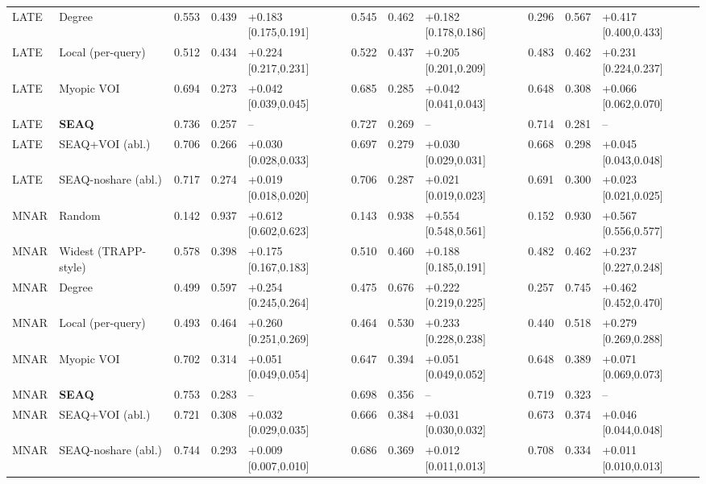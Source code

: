 \begin{table}[t]
\begin{tabular}{llccl|ccl|ccl}
LATE & Degree & 0.553 & 0.439 & +0.183 [0.175,0.191] & 0.545 & 0.462 & +0.182 [0.178,0.186] & 0.296 & 0.567 & +0.417 [0.400,0.433] \\
LATE & Local (per-query) & 0.512 & 0.434 & +0.224 [0.217,0.231] & 0.522 & 0.437 & +0.205 [0.201,0.209] & 0.483 & 0.462 & +0.231 [0.224,0.237] \\
LATE & Myopic VOI & 0.694 & 0.273 & +0.042 [0.039,0.045] & 0.685 & 0.285 & +0.042 [0.041,0.043] & 0.648 & 0.308 & +0.066 [0.062,0.070] \\
LATE & \textbf{SEAQ} & 0.736 & 0.257 & -- & 0.727 & 0.269 & -- & 0.714 & 0.281 & -- \\
LATE & SEAQ+VOI (abl.) & 0.706 & 0.266 & +0.030 [0.028,0.033] & 0.697 & 0.279 & +0.030 [0.029,0.031] & 0.668 & 0.298 & +0.045 [0.043,0.048] \\
LATE & SEAQ-noshare (abl.) & 0.717 & 0.274 & +0.019 [0.018,0.020] & 0.706 & 0.287 & +0.021 [0.019,0.023] & 0.691 & 0.300 & +0.023 [0.021,0.025] \\
\midrule
MNAR & Random & 0.142 & 0.937 & +0.612 [0.602,0.623] & 0.143 & 0.938 & +0.554 [0.548,0.561] & 0.152 & 0.930 & +0.567 [0.556,0.577] \\
MNAR & Widest (TRAPP-style) & 0.578 & 0.398 & +0.175 [0.167,0.183] & 0.510 & 0.460 & +0.188 [0.185,0.191] & 0.482 & 0.462 & +0.237 [0.227,0.248] \\
MNAR & Degree & 0.499 & 0.597 & +0.254 [0.245,0.264] & 0.475 & 0.676 & +0.222 [0.219,0.225] & 0.257 & 0.745 & +0.462 [0.452,0.470] \\
MNAR & Local (per-query) & 0.493 & 0.464 & +0.260 [0.251,0.269] & 0.464 & 0.530 & +0.233 [0.228,0.238] & 0.440 & 0.518 & +0.279 [0.269,0.288] \\
MNAR & Myopic VOI & 0.702 & 0.314 & +0.051 [0.049,0.054] & 0.647 & 0.394 & +0.051 [0.049,0.052] & 0.648 & 0.389 & +0.071 [0.069,0.073] \\
MNAR & \textbf{SEAQ} & 0.753 & 0.283 & -- & 0.698 & 0.356 & -- & 0.719 & 0.323 & -- \\
MNAR & SEAQ+VOI (abl.) & 0.721 & 0.308 & +0.032 [0.029,0.035] & 0.666 & 0.384 & +0.031 [0.030,0.032] & 0.673 & 0.374 & +0.046 [0.044,0.048] \\
MNAR & SEAQ-noshare (abl.) & 0.744 & 0.293 & +0.009 [0.007,0.010] & 0.686 & 0.369 & +0.012 [0.011,0.013] & 0.708 & 0.334 & +0.011 [0.010,0.013] \\
\bottomrule\end{tabular}\end{table}
